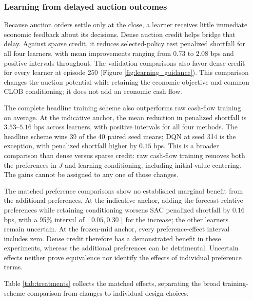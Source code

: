 \documentclass[11pt]{article}
\begin{document}
\subsubsection{Learning from delayed auction outcomes}
Because auction orders settle only at the close, a learner receives little immediate economic feedback about its decisions. Dense auction credit helps bridge that delay. Against sparse credit, it reduces selected-policy test penalized shortfall for all four learners, with mean improvements ranging from $0.73$ to $2.08$ bps and positive intervals throughout. The validation comparisons also favor dense credit for every learner at episode 250 (Figure \ref{fig:learning_guidance}). This comparison changes the auction potential while retaining the economic objective and common CLOB conditioning; it does not add an economic cash flow.\vspace{0.5em}

The complete headline training scheme also outperforms raw cash-flow training on average. At the indicative anchor, the mean reduction in penalized shortfall is $3.53$--$5.16$ bps across learners, with positive intervals for all four methods. The headline scheme wins 39 of the 40 paired seed means; DQN at seed 314 is the exception, with penalized shortfall higher by $0.15$ bps. This is a broader comparison than dense versus sparse credit: raw cash-flow training removes both the preferences in $J$ and learning conditioning, including initial-value centering. The gains cannot be assigned to any one of those changes.\vspace{0.5em}

The matched preference comparisons show no established marginal benefit from the additional preferences. At the indicative anchor, adding the forecast-relative preferences while retaining conditioning worsens SAC penalized shortfall by $0.16$ bps, with a 95\% interval of $[0.05,0.30]$ for the increase; the other learners remain uncertain. At the frozen-mid anchor, every preference-effect interval includes zero. Dense credit therefore has a demonstrated benefit in these experiments, whereas the additional preferences can be detrimental. Uncertain effects neither prove equivalence nor identify the effects of individual preference terms.\vspace{0.5em}

Table \ref{tab:treatments} collects the matched effects, separating the broad training-scheme comparison from changes to individual design choices.
\end{document}
